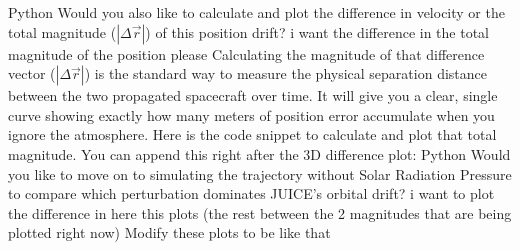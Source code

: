 {}Python\markdownRendererInterblockSeparator
{}\markdownRendererInterblockSeparator
{}Would you also like to calculate and plot the difference in velocity or the total magnitude ($|\Delta \vec{r}|$) of this position drift?\markdownRendererInterblockSeparator
{}\markdownRendererThematicBreak{}\markdownRendererInterblockSeparator
{}
\markdownRendererSectionEnd \markdownRendererSectionBegin
{}\markdownRendererInterblockSeparator
{}i want the difference in the total magnitude of the position please\markdownRendererInterblockSeparator
{}
\markdownRendererSectionEnd \markdownRendererSectionBegin
{}\markdownRendererInterblockSeparator
{}Calculating the magnitude of that difference vector ($| \Delta \vec{r} |$) is the standard way to measure the physical separation distance between the two propagated spacecraft over time. It will give you a clear, single curve showing exactly how many meters of position error accumulate when you ignore the atmosphere.\markdownRendererInterblockSeparator
{}Here is the code snippet to calculate and plot that total magnitude. You can append this right after the 3D difference plot:\markdownRendererInterblockSeparator
{}Python\markdownRendererInterblockSeparator
{}\markdownRendererInterblockSeparator
{}Would you like to move on to simulating the trajectory without Solar Radiation Pressure to compare which perturbation dominates JUICE's orbital drift?\markdownRendererInterblockSeparator
{}\markdownRendererThematicBreak{}\markdownRendererInterblockSeparator
{}
\markdownRendererSectionEnd \markdownRendererSectionBegin
{}\markdownRendererInterblockSeparator
{}i want to plot the difference in here this plots (the rest between the 2 magnitudes that are being plotted right now) Modify these plots to be like that\markdownRendererInterblockSeparator
{}
\markdownRendererSectionEnd 
\markdownRendererSectionEnd \markdownRendererSectionBegin
\markdownRendererHeadingOne{-------------------------------------------------------------------------}\markdownRendererInterblockSeparator
{}
\markdownRendererSectionEnd \markdownRendererSectionBegin
{}\markdownRendererInterblockSeparator
{}
\markdownRendererSectionEnd \markdownRendererSectionBegin
\markdownRendererHeadingOne{-------------------------------------------------------------------------}\markdownRendererInterblockSeparator

